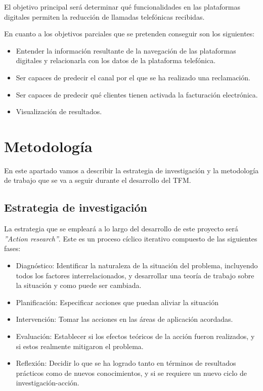 El objetivo principal será determinar qué funcionalidades en las plataformas digitales permiten la reducción de llamadas telefónicas recibidas.

En cuanto a los objetivos parciales que se pretenden conseguir son los siguientes: 
\begin{itemize}
    \item Entender la información resultante de la navegación de las plataformas digitales y relacionarla con los datos de la plataforma telefónica.
    \item Ser capaces de predecir el canal por el que se ha realizado una reclamación.
    \item Ser capaces de predecir qué clientes tienen activada la facturación electrónica.
    \item Visualización de resultados.
\end{itemize}


\section{Metodología}
En este apartado vamos a describir la estrategia de investigación y la metodología de trabajo que se va a seguir durante el desarrollo del TFM.

\subsection{Estrategia de investigación}

La estrategia que se empleará a lo largo del desarrollo de este proyecto será \textit{''Action research”}\cite{oates}. Este es un proceso cíclico iterativo compuesto de las siguientes fases:
\begin{itemize}
    \item Diagnóstico: Identificar la naturaleza de la situación del problema, incluyendo todos los factores interrelacionados, y desarrollar una teoría de trabajo sobre la situación y como puede ser cambiada. 
    \item Planificación: Especificar acciones que puedan aliviar la situación 
    \item Intervención: Tomar las acciones en las áreas de aplicación acordadas.
    \item Evaluación: Establecer si los efectos teóricos de la acción fueron realizados, y si estos realmente mitigaron el problema. 
    \item Reflexión: Decidir lo que se ha logrado tanto en términos de resultados prácticos como de nuevos conocimientos, y si se requiere un nuevo ciclo de investigación-acción.
\end{itemize}

